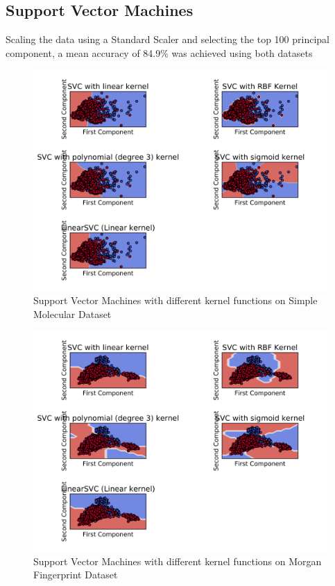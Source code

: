 \documentclass[a4paper,12pt]{report}
\begin{document}
		\subsection{Support Vector Machines}
		Scaling the data using a Standard Scaler and selecting the top 100 principal component, a mean accuracy of 84.9\% was achieved using both datasets
			\begin{figure}[H]
				\centering
				\includegraphics[width=\textwidth,scale=1,totalheight=0.4\textheight]{images/mol_decision_svm}
				\caption{Support Vector Machines with different kernel functions on Simple Molecular Dataset}
				\label{fig:svm_mol}
			\end{figure}
			\begin{figure}[H]
				\centering
				\includegraphics[width=\textwidth,scale=1,totalheight=0.4\textheight]{images/fps_decision_svm}
				\caption{Support Vector Machines with different kernel functions on Morgan Fingerprint Dataset}
				\label{fig:svm_fps}
			\end{figure}
\end{document}
